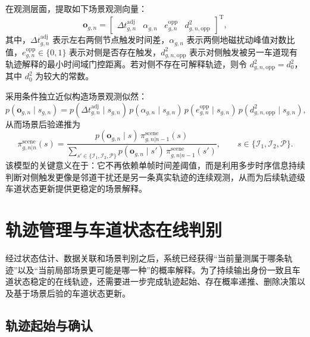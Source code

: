 \documentclass{xdupgthesis}
\begin{document}
在观测层面，提取如下场景观测向量：
\begin{equation}
	\mathbf o_{g,n}=
	\begin{bmatrix}
		\Delta t_{g,n}^{\mathrm{adj}} &
		\alpha_{g,n} &
		e_{g,n}^{\mathrm{opp}} &
		d_{g,n,\mathrm{opp}}^2
	\end{bmatrix}^{\mathrm T},
	\label{eq:ch3_scene_obs}
\end{equation}
其中，$\Delta t_{g,n}^{\mathrm{adj}}$ 表示左右两侧节点触发时间差，$\alpha_{g,n}$ 表示两侧地磁扰动峰值对数比值，$e_{g,n}^{\mathrm{opp}}\in\{0,1\}$ 表示对侧是否存在触发，$d_{g,n,\mathrm{opp}}^2$ 表示对侧触发被另一车道现有轨迹解释的最小时间域门控距离。若对侧不存在可解释轨迹，则令 $d_{g,n,\mathrm{opp}}^2=d_0^2$，其中 $d_0^2$ 为较大的常数。

采用条件独立近似构造场景观测似然：
\begin{equation}
	p(\mathbf o_{g,n}\mid s_{g,n})
	=
	p(\Delta t_{g,n}^{\mathrm{adj}}\mid s_{g,n})\,
	p(\alpha_{g,n}\mid s_{g,n})\,
	p(e_{g,n}^{\mathrm{opp}}\mid s_{g,n})\,
	p(d_{g,n,\mathrm{opp}}^2\mid s_{g,n}),
	\label{eq:ch3_scene_likelihood}
\end{equation}
从而场景后验递推为
\begin{equation}
	\pi_{g,n|n}^{\mathrm{scene}}(s)
	=
	\frac{p(\mathbf o_{g,n}\mid s)\,\pi_{g,n|n-1}^{\mathrm{scene}}(s)}{\sum\limits_{s'\in\{\mathcal I_1,\mathcal I_2,\mathcal P\}}p(\mathbf o_{g,n}\mid s')\,\pi_{g,n|n-1}^{\mathrm{scene}}(s')},
	\qquad s\in\{\mathcal I_1,\mathcal I_2,\mathcal P\}.
	\label{eq:ch3_scene_update}
\end{equation}
该模型的关键意义在于：它不再依赖单帧时间差阈值，而是利用多步时序信息持续判断对侧触发更像是邻道干扰还是另一条真实轨迹的连续观测，从而为后续轨迹级车道状态更新提供更稳定的场景解释。

\section{轨迹管理与车道状态在线判别}
\label{sec:ch3_track_management}

经过状态估计、数据关联和场景判别之后，系统已经获得“当前量测属于哪条轨迹”以及“当前局部场景更可能是哪一种”的概率解释。为了持续输出身份一致且车道状态稳定的在线轨迹，还需要进一步完成轨迹起始、存在概率递推、删除决策以及基于场景后验的车道状态更新。

\subsection{轨迹起始与确认}
\end{document}
